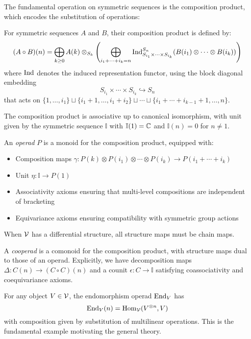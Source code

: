The fundamental operation on symmetric sequences is the composition product, which encodes the substitution of operations:
 
\begin{definition}
For symmetric sequences $A$ and $B$, their composition product is defined by:
\[
(A \circ B)(n) = \bigoplus_{k \geq 0} A(k) \otimes_{S_k} \left( \bigoplus_{i_1 + \cdots + i_k = n} \operatorname{Ind}_{S_{i_1} \times \cdots \times S_{i_k}}^{S_n}(B(i_1) \otimes \cdots \otimes B(i_k)) \right)
\]
where $\operatorname{Ind}$ denotes the induced representation functor, using the block diagonal embedding 
\[
S_{i_1} \times \cdots \times S_{i_k} \hookrightarrow S_n
\]
that acts on $\{1, \ldots, i_1\} \sqcup \{i_1 + 1, \ldots, i_1 + i_2\} \sqcup \cdots \sqcup \{i_1 + \cdots + i_{k-1} + 1, \ldots, n\}$.
\end{definition}
 
The composition product is associative up to canonical isomorphism, with unit given by the symmetric sequence $\mathbb{I}$ with $\mathbb{I}(1) = \mathbb{C}$ and $\mathbb{I}(n) = 0$ for $n \neq 1$.
 
\begin{definition}[Operad]
An \emph{operad} $P$ is a monoid for the composition product, equipped with:
\begin{itemize}
\item Composition maps $\gamma : P(k) \otimes P(i_1) \otimes \cdots \otimes P(i_k) \to P(i_1 + \cdots + i_k)$
\item Unit $\eta : \mathbb{I} \to P(1)$ 
\item Associativity axioms ensuring that multi-level compositions are independent of bracketing
\item Equivariance axioms ensuring compatibility with symmetric group actions
\end{itemize}
When $\mathcal{V}$ has a differential structure, all structure maps must be chain maps.
\end{definition}
 
\begin{definition}[Cooperad]
A \emph{cooperad} is a comonoid for the composition product, with structure maps dual to those of an operad. Explicitly, we have decomposition maps $\Delta : C(n) \to (C \circ C)(n)$ and a counit $\epsilon : C \to \mathbb{I}$ satisfying coassociativity and coequivariance axioms.
\end{definition}
 
\begin{example}
For any object $V \in \mathcal{V}$, the endomorphism operad $\operatorname{End}_V$ has 
\[
\operatorname{End}_V(n) = \operatorname{Hom}_{\mathcal{V}}(V^{\otimes n}, V)
\]
with composition given by substitution of multilinear operations. This is the fundamental example motivating the general theory.
\end{example}
 
